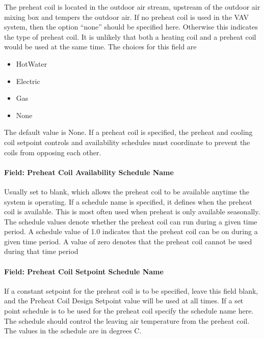 The preheat coil is located in the outdoor air stream, upstream of the outdoor air mixing box and tempers the outdoor air. If no preheat coil is used in the VAV system, then the option ``none'' should be specified here. Otherwise this indicates the type of preheat coil. It is unlikely that both a heating coil and a preheat coil would be used at the same time. The choices for this field are

\begin{itemize}
\item
  HotWater
\item
  Electric
\item
  Gas
\item
  None
\end{itemize}

The default value is None. If a preheat coil is specified, the preheat and cooling coil setpoint controls and availability schedules must coordinate to prevent the coils from opposing each other.

\paragraph{Field: Preheat Coil Availability Schedule Name}\label{field-preheat-coil-availability-schedule-name}

Usually set to blank, which allows the preheat coil to be available anytime the system is operating. If a schedule name is specified, it defines when the preheat coil is available. This is most often used when preheat is only available seasonally. The schedule values denote whether the preheat coil can run during a given time period. A schedule value of 1.0 indicates that the preheat coil can be on during a given time period. A value of zero denotes that the preheat coil cannot be used during that time period

\paragraph{Field: Preheat Coil Setpoint Schedule Name}\label{field-preheat-coil-setpoint-schedule-name}

If a constant setpoint for the preheat coil is to be specified, leave this field blank, and the Preheat Coil Design Setpoint value will be used at all times. If a set point schedule is to be used for the preheat coil specify the schedule name here. The schedule should control the leaving air temperature from the preheat coil. The values in the schedule are in degrees C.

